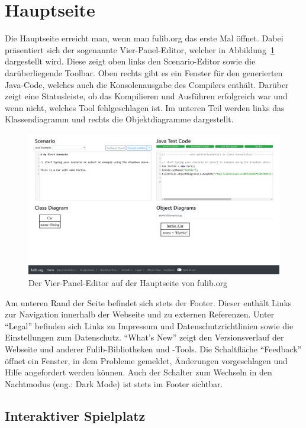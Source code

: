 \section{Hauptseite}\label{sec:main-page}

Die Hauptseite erreicht man, wenn man fulib.org das erste Mal öffnet.
Dabei präsentiert sich der sogenannte Vier-Panel-Editor, welcher in Abbildung~\ref{fig:four-pane-editor} dargestellt wird.
Diese zeigt oben links den Scenario-Editor sowie die darüberliegende Toolbar.
Oben rechts gibt es ein Fenster für den generierten Java-Code, welches auch die Konsolenausgabe des Compilers enthält.
Darüber zeigt eine Statusleiste, ob das Kompilieren und Ausführen erfolgreich war und wenn nicht, welches Tool fehlgeschlagen ist.
Im unteren Teil werden links das Klassendiagramm und rechts die Objektdiagramme dargestellt.

\begin{figure}
    \includegraphics[width=\textwidth]{chapter/fulib.org/img/four-pane-editor.png}
    \caption{Der Vier-Panel-Editor auf der Hauptseite von fulib.org}
    \label{fig:four-pane-editor}
\end{figure}

Am unteren Rand der Seite befindet sich stets der Footer.
Dieser enthält Links zur Navigation innerhalb der Webseite und zu externen Referenzen.
Unter ``Legal'' befinden sich Links zu Impressum und Datenschutzrichtlinien sowie die Einstellungen zum Datenschutz.
``What's New'' zeigt den Versionsverlauf der Webseite und anderer Fulib-Bibliotheken und -Tools.
Die Schaltfläche ``Feedback'' öffnet ein Fenster, in dem Probleme gemeldet, Änderungen vorgeschlagen und Hilfe angefordert werden können.
Auch der Schalter zum Wechseln in den Nachtmodus (eng.: Dark Mode) ist stets im Footer sichtbar.

\subsection{Interaktiver Spielplatz}\label{subsec:interactive-playground}

